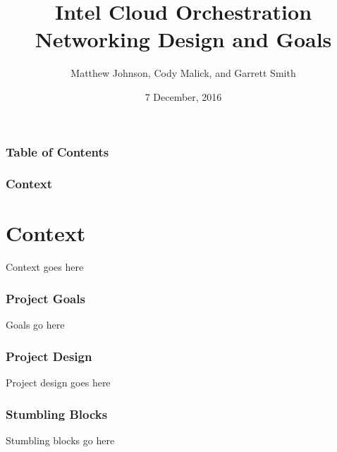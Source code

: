 \documentclass[pdf]{beamer}
\begin{document}
\title{Intel Cloud Orchestration Networking Design and Goals}
\author{Matthew Johnson, Cody Malick, and Garrett Smith}
\date{7 December, 2016}

\maketitle
\begin{frame}
	\frametitle{Table of Contents}
	\tableofcontents
\end{frame}

\begin{frame}
	\frametitle{Context}
	\section{Context}
	Context goes here
\end{frame}
\begin{frame}
	\frametitle{Project Goals}
	Goals go here
\end{frame}

\begin{frame}
	\frametitle{Project Design}
	Project design goes here
\end{frame}

\begin{frame}
	\frametitle{Stumbling Blocks}
	Stumbling blocks go here
\end{frame}
\end{document}
